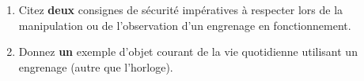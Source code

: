\documentclass[11pt]{article}
\begin{document}
\begin{exercice}
\begin{enumerate}
    \item Citez \textbf{deux} consignes de sécurité impératives à respecter lors de la manipulation ou de l'observation d'un engrenage en fonctionnement.
    \item Donnez \textbf{un} exemple d'objet courant de la vie quotidienne utilisant un engrenage (autre que l'horloge).
\end{enumerate}
\end{exercice}
\end{document}
